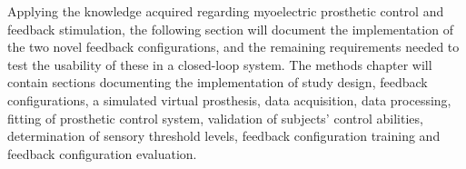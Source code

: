 

Applying the knowledge acquired regarding myoelectric prosthetic control and feedback stimulation, the following section will document the implementation of the two novel feedback configurations, and the remaining requirements needed to test the usability of these in a closed-loop system. The methods chapter will contain sections documenting the implementation of study design, feedback configurations, a simulated virtual prosthesis, data acquisition, data processing, fitting of prosthetic control system, validation of subjects' control abilities, determination of sensory threshold levels, feedback configuration training and feedback configuration evaluation.      